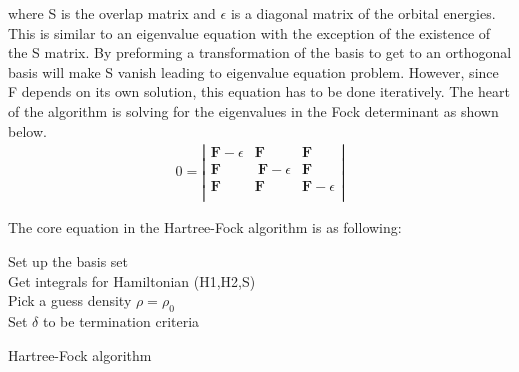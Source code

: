 \documentclass[twoside]{article}
\begin{document}


where S is the overlap matrix and $\epsilon$ is a diagonal matrix of the orbital energies. This is similar to an eigenvalue equation with the exception of the existence of the S matrix. By preforming a transformation of the basis to get to an orthogonal basis will make S vanish leading to eigenvalue equation problem. However, since F depends on its own solution, this equation has to be done iteratively. The heart of the algorithm is solving for the eigenvalues in the Fock determinant as shown below.\\
\begin{eqnarray}
0 =
\left|
\begin{array}{ccc}
\textbf{F}-\epsilon &\textbf{F}&\textbf{F}\\
\textbf{F}&\ \textbf{F}-\epsilon &\textbf{F}\\
\textbf{F}&\textbf{F}&\textbf{F}-\epsilon \\
\end{array}
\right|
\end{eqnarray}


The core equation in the Hartree-Fock algorithm is as following: \\
\begin{algorithm}[htb]
 \KwData{ }
	Set up the basis set\\
	Get integrals for Hamiltonian (H1,H2,S)\\
	Pick a guess density $\rho = \rho_0$ \\
	Set $\delta$ to be termination criteria \\
 \caption{Hartree-Fock algorithm}
\end{algorithm}
 
\end{document}
